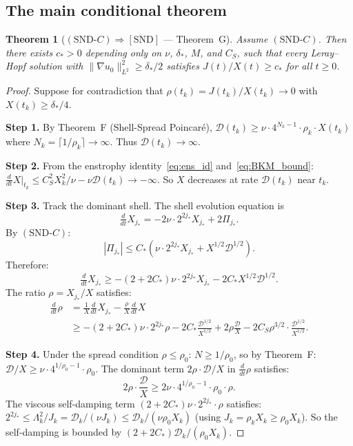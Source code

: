 \documentclass[11pt]{article}
\newtheorem{theorem}{Theorem}[section]
\newcommand{\norm}[2]{\|{#1}\|_{#2}}
\newcommand{\ddt}{\tfrac{d}{dt}}
\newcommand{\DD}{\mathcal{D}}
\begin{document}
\subsection{The main conditional theorem}

\begin{theorem}[{$(\mathrm{SND}\text{-}C)\Rightarrow[\mathrm{SND}]$}
  --- Theorem~G]\label{thm:G}
Assume $(\mathrm{SND}\text{-}C)$. Then there exists $c_*>0$
depending only on $\nu$, $\delta_*$, $M$, and $C_S$, such that
every Leray--Hopf solution with $\norm{\nabla u_0}{L^2}^2\ge\delta_*/2$
satisfies $J(t)/X(t)\ge c_*$ for all $t\ge0$.
\end{theorem}

\begin{proof}
Suppose for contradiction that $\rho(t_k)=J(t_k)/X(t_k)\to0$
with $X(t_k)\ge\delta_*/4$.

\medskip\noindent\textbf{Step 1.}
By Theorem~F (Shell-Spread Poincar\'e),
$\DD(t_k)\ge\nu\cdot 4^{N_k-1}\cdot\rho_k\cdot X(t_k)$
where $N_k=\lceil 1/\rho_k\rceil\to\infty$.
Thus $\DD(t_k)\to\infty$.

\medskip\noindent\textbf{Step 2.}
From the enstrophy identity~\eqref{eq:ens_id} and~\eqref{eq:BKM_bound}:
$\ddt X|_{t_k}\le C_S^2 X_k^2/\nu - \nu\DD(t_k)\to-\infty$.
So $X$ decreases at rate $\DD(t_k)$ near $t_k$.

\medskip\noindent\textbf{Step 3.}
Track the dominant shell. The shell evolution equation is
\[
  \ddt X_{j_*}
  = -2\nu\cdot 2^{2j_*} X_{j_*} + 2\Pi_{j_*}.
\]
By $(\mathrm{SND}\text{-}C)$:
\[
  |\Pi_{j_*}|
  \le C_*\!\left(\nu\cdot 2^{2j_*} X_{j_*} + X^{1/2}\DD^{1/2}\right).
\]
Therefore:
\begin{equation}\label{eq:shell_ode}
  \ddt X_{j_*}
  \ge -(2+2C_*)\nu\cdot 2^{2j_*}X_{j_*}
    - 2C_* X^{1/2}\DD^{1/2}.
\end{equation}
The ratio $\rho = X_{j_*}/X$ satisfies:
\begin{align*}
  \ddt\rho
  &= \frac{1}{X}\ddt X_{j_*} - \frac{\rho}{X}\ddt X\\
  &\ge -(2+2C_*)\nu\cdot 2^{2j_*}\rho
    - 2C_*\frac{\DD^{1/2}}{X^{1/2}}
    + 2\rho\frac{\DD}{X}
    - 2C_S\rho^{3/2}\cdot\frac{\DD^{1/2}}{X^{1/2}}.
\end{align*}

\medskip\noindent\textbf{Step 4.}
Under the spread condition $\rho\le\rho_0$:
$N\ge1/\rho_0$, so by Theorem~F:
$\DD/X\ge\nu\cdot 4^{1/\rho_0-1}\cdot\rho_0$.
The dominant term $2\rho\cdot\DD/X$ in $\ddt\rho$ satisfies:
\[
  2\rho\cdot\frac{\DD}{X}
  \ge 2\nu\cdot 4^{1/\rho_0-1}\cdot\rho_0\cdot\rho.
\]
The viscous self-damping term
$(2+2C_*)\nu\cdot 2^{2j_*}\cdot\rho$ satisfies:
$2^{2j_*}\le\Lambda_k^2/J_k = \DD_k/(\nu J_k)\le\DD_k/(\nu\rho_0 X_k)$
(using $J_k=\rho_k X_k\ge\rho_0 X_k$).
So the self-damping is bounded by
$(2+2C_*)\DD_k/(\rho_0 X_k)$.


\end{proof}
\end{document}
